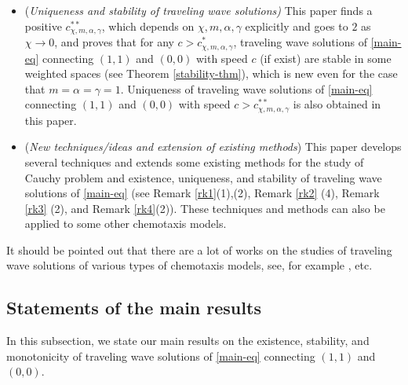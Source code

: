 \documentclass[11pt]{article} %
\theoremstyle{remark}
\theoremstyle{remark}
\numberwithin{equation}{section}
\numberwithin{figure}{section}
\numberwithin{table}{section}
\begin{document}
\begin{itemize}
\item ({\it Uniqueness and stability of traveling wave solutions)} This paper finds a positive $c^{**}_{\chi,m,\alpha,\gamma}$, which depends on $\chi, m,\alpha, \gamma$ explicitly and goes to $2$ as $\chi\to 0$, and proves that  for any $c>c^*_{\chi,m,\alpha,\gamma}$,   traveling wave solutions of \eqref{main-eq} connecting $(1,1)$ and $(0,0)$ with speed $c$ (if exist) are stable in some weighted spaces (see Theorem \ref{stability-thm}), which is new even for the case that $m=\alpha=\gamma=1$. Uniqueness of traveling wave solutions of \eqref{main-eq} connecting $(1,1)$ and $(0,0)$ with speed $c>c^{**}_{\chi,m,\alpha,\gamma}$ is also obtained in this paper. 


\item ({\it  New techniques/ideas and extension of existing methods}) This paper develops several techniques and extends  some existing methods for the study of Cauchy problem and existence, uniqueness,  and stability of traveling wave solutions of \eqref{main-eq} (see   Remark \ref{rk1}(1),(2), Remark \ref{rk2} (4), Remark \ref{rk3} (2), and Remark \ref{rk4}(2)). These techniques and methods can also be applied to some other chemotaxis models.
\end{itemize}


It should be pointed out that  there are a lot of works  on the  studies of  traveling
wave solutions of various  types of chemotaxis models, see, for example 
\cite{AiHuWa,AiWa, ChCh, ChZo,FuMiTs,HoSt, LiLiXu,LiLiWa,MaNoSh,NaPeRy2008,Wan}, etc.



\subsection{Statements of the main results}

In this subsection, we state our main results on the existence,  stability, and monotonicity of traveling wave solutions of \eqref{main-eq} connecting $(1,1)$ and $(0,0)$. 
\end{document}
